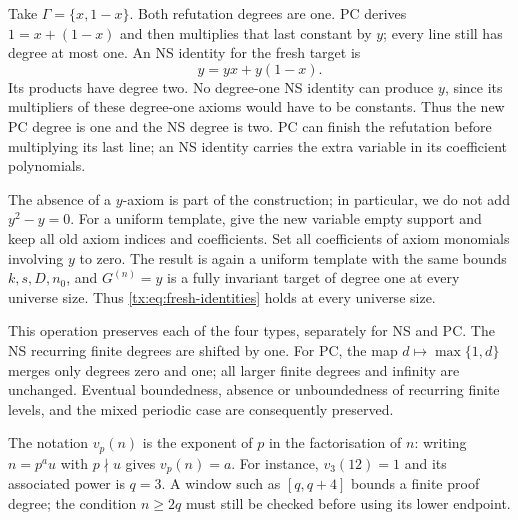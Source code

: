 \begin{example}
Take $\Gamma=\{x,1-x\}$. Both refutation degrees are one. PC derives
$1=x+(1-x)$ and then multiplies that last constant by $y$; every line
still has degree at most one. An NS identity for the fresh target is
\[
                             y=yx+y(1-x).
\]
Its products have degree two. No degree-one NS identity can produce
$y$, since its multipliers of these degree-one axioms would have to
be constants. Thus the new PC degree is one and the NS degree is two.
PC can finish the refutation before multiplying its last line; an NS
identity carries the extra variable in its coefficient polynomials.
\end{example}

The absence of a $y$-axiom is part of the construction; in particular,
we do not add $y^2-y=0$. For a uniform template, give the new variable
empty support and keep all old axiom indices and coefficients. Set
all coefficients of axiom monomials involving $y$ to zero. The result
is again a uniform template with the same bounds $k,s,D,n_0$, and
$G^{(n)}=y$ is a fully invariant target of degree one at every universe size.
Thus \eqref{tx:eq:fresh-identities} holds at every universe size.

This operation preserves each of the four types, separately for NS
and PC. The NS recurring finite degrees are shifted by one. For PC,
the map $d\mapsto\max\{1,d\}$ merges only degrees zero and one;
all larger finite degrees and infinity are unchanged. Eventual
boundedness, absence or unboundedness of recurring finite levels, and
the mixed periodic case are consequently preserved.

The notation $v_p(n)$ is the exponent of $p$ in the factorisation of
$n$: writing $n=p^a u$ with $p\nmid u$ gives $v_p(n)=a$.
For instance, $v_3(12)=1$ and its associated power is $q=3$.
A window such as $[q,q+4]$ bounds a finite proof degree; the condition
$n\ge2q$ must still be checked before using its lower endpoint.

